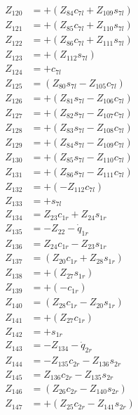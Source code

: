 \begin{multicols}{2}
\begin{align}
Z_{120} &= + (Z_{84}c_{7l} + Z_{109}s_{7l}) \nonumber \\
Z_{121} &= + (Z_{85}c_{7l} + Z_{110}s_{7l}) \nonumber \\
Z_{122} &= + (Z_{86}c_{7l} + Z_{111}s_{7l}) \nonumber \\
Z_{123} &= + (Z_{112}s_{7l}) \nonumber \\
Z_{124} &= + c_{7l} \nonumber \\
Z_{125} &= (Z_{80}s_{7l} - Z_{105}c_{7l}) \nonumber \\
Z_{126} &= + (Z_{81}s_{7l} - Z_{106}c_{7l}) \nonumber \\
Z_{127} &= + (Z_{82}s_{7l} - Z_{107}c_{7l}) \nonumber \\
Z_{128} &= + (Z_{83}s_{7l} - Z_{108}c_{7l}) \nonumber \\
Z_{129} &= + (Z_{84}s_{7l} - Z_{109}c_{7l}) \nonumber \\
Z_{130} &= + (Z_{85}s_{7l} - Z_{110}c_{7l}) \nonumber \\
Z_{131} &= + (Z_{86}s_{7l} - Z_{111}c_{7l}) \nonumber \\
Z_{132} &= + (-Z_{112}c_{7l}) \nonumber \\
Z_{133} &= + s_{7l} \nonumber \\
Z_{134} &= Z_{23}c_{1r} + Z_{24}s_{1r} \nonumber \\
Z_{135} &=                 - Z_{22} - \dot{q}_{1r} \nonumber \\
Z_{136} &= Z_{24}c_{1r} - Z_{23}s_{1r} \nonumber \\
Z_{137} &= (Z_{20}c_{1r} + Z_{28}s_{1r}) \nonumber \\
Z_{138} &= + (Z_{27}s_{1r}) \nonumber \\
Z_{139} &= + (-c_{1r}) \nonumber \\
Z_{140} &= (Z_{28}c_{1r} - Z_{20}s_{1r}) \nonumber \\
Z_{141} &= + (Z_{27}c_{1r}) \nonumber \\
Z_{142} &= + s_{1r} \nonumber \\
Z_{143} &= - Z_{134} - \dot{q}_{2r} \nonumber \\
Z_{144} &= - Z_{135}c_{2r} - Z_{136}s_{2r} \nonumber \\
Z_{145} &=   Z_{136}c_{2r} - Z_{135}s_{2r} \nonumber \\                                                                                                
Z_{146} &= (Z_{26}c_{2r} - Z_{140}s_{2r}) \nonumber \\ 
Z_{147} &= + (Z_{25}c_{2r} - Z_{141}s_{2r}) \nonumber \\

\end{align}
\end{multicols}
